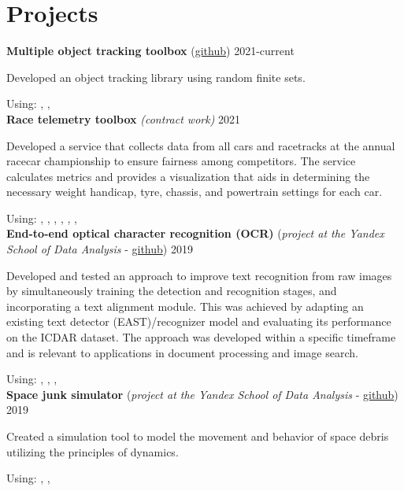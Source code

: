 \section*{\sectionformat Projects}

\textbf{Multiple object tracking toolbox} (\href{https://github.com/neer201/Multi-Object-Tracking-for-Automotive-Systems-in-python}{github}) \hfill 2021-current

Developed an object tracking library using random finite sets.

Using: , , 
\\
\textbf{Race telemetry toolbox} \textit{(contract work)} \hfill 2021
\par
Developed a service that collects data from all cars and racetracks at the annual racecar championship to ensure fairness among competitors. The service calculates metrics and provides a visualization that aids in determining the necessary weight handicap, tyre, chassis, and powertrain settings for each car.

Using: , , , , , , 
\\
\textbf{End-to-end optical character recognition (OCR)} (\textit{project at the Yandex School of Data Analysis} - \href{https://github.com/neer201/end2end_OCR}{github})  \hfill 2019
\par
Developed and tested an approach to improve text recognition from raw images by simultaneously training the detection and recognition stages, and incorporating a text alignment module. This was achieved by adapting an existing text detector (EAST)/recognizer model and evaluating its performance on the ICDAR dataset. The approach was developed within a specific timeframe and is relevant to applications in document processing and image search.

Using: , , ,
% 
\\
\textbf{Space junk simulator} (\textit{project at the Yandex School of Data Analysis} - \href{https://github.com/neer201/space_junk_simulator}{github})   \hfill 2019
\par
Created a simulation tool to model the movement and behavior of space debris utilizing the principles of dynamics.

Using: , , 
